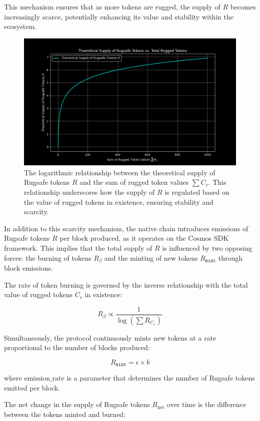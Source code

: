 \documentclass{article}
\begin{document}
This mechanism ensures that as more tokens are rugged, the supply of $R$ becomes increasingly scarce, potentially enhancing its value and stability within the ecosystem.

\begin{figure}[h]
\centering
\includegraphics[width=\textwidth]{images/5.png}
\caption{The logarithmic relationship between the theoretical supply of Rugsafe tokens $R$ and the sum of rugged token values $\sum C_r$. This relationship underscores how the supply of $R$ is regulated based on the value of rugged tokens in existence, ensuring stability and scarcity.}
\label{fig:minted_anticoins}
\end{figure}

In addition to this scarcity mechanism, the native chain introduces emissions of Rugsafe tokens $R$ per block produced, as it operates on the Cosmos SDK framework. This implies that the total supply of $R$ is influenced by two opposing forces: the burning of tokens $R_\beta$ and the minting of new tokens $R_\texttt{mint}$ through block emissions.

The rate of token burning is governed by the inverse relationship with the total value of rugged tokens $C_r$ in existence:

\[
R_{\beta} \propto \frac{1}{\log\left(\sum R_{C_v}\right)}
\]

Simultaneously, the protocol continuously mints new tokens at a rate proportional to the number of blocks produced:

\[
R_{\texttt{mint}} = \epsilon \times b
\]

where $\text{emission\_rate}$ is a parameter that determines the number of Rugsafe tokens emitted per block.

The net change in the supply of Rugsafe tokens $R_\text{net}$ over time is the difference between the tokens minted and burned:
\end{document}
